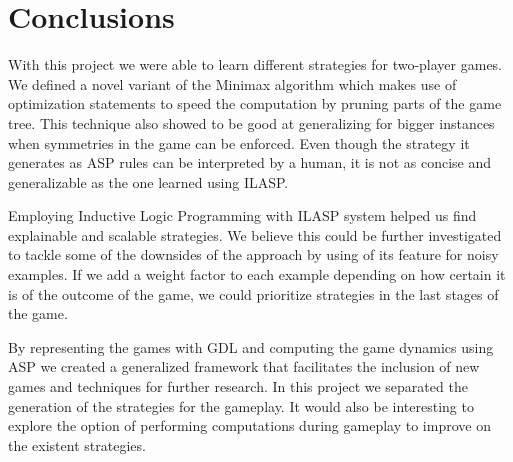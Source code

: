 \section{Conclusions}
\label{conclusions}
With this project we were able to learn different strategies for two-player games. We defined a novel variant of the Minimax algorithm which makes use of optimization statements to speed the computation by pruning parts of the game tree. This technique also showed to be good at generalizing for bigger instances when symmetries in the game can be enforced. Even though the strategy it generates as ASP rules can be interpreted by a human, it is not as concise and generalizable as the one learned using ILASP.

Employing Inductive Logic Programming with ILASP system helped us find explainable and scalable strategies. We believe this could be further investigated to tackle some of the downsides of the approach by using of its feature for noisy examples. If we add a weight factor to each example depending on how certain it is of the outcome of the game, we could prioritize strategies in the last stages of the game.

By representing the games with GDL and computing the game dynamics using ASP we created a generalized framework that facilitates the inclusion of new games and techniques for further research. In this project we separated the generation of the strategies for the gameplay. It would also be interesting to explore the option of performing computations during gameplay to improve on the existent strategies.
